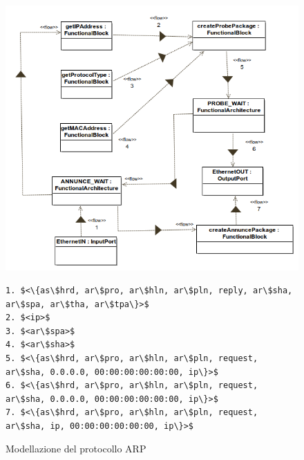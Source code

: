 \begin{figure}[h!] 
    \centering 
    \includegraphics[scale=0.6]{img/ARP/ARP.png} 
    \begin{lstlisting}[frame=single, mathescape, basicstyle=\footnotesize]
1. $<\{as\$hrd, ar\$pro, ar\$hln, ar\$pln, reply, ar\$sha, ar\$spa, ar\$tha, ar\$tpa\}>$
2. $<ip>$
3. $<ar\$spa>$
4. $<ar\$sha>$
5. $<\{as\$hrd, ar\$pro, ar\$hln, ar\$pln, request, ar\$sha, 0.0.0.0, 00:00:00:00:00:00, ip\}>$
6. $<\{as\$hrd, ar\$pro, ar\$hln, ar\$pln, request, ar\$sha, 0.0.0.0, 00:00:00:00:00:00, ip\}>$
7. $<\{as\$hrd, ar\$pro, ar\$hln, ar\$pln, request, ar\$sha, ip, 00:00:00:00:00:00, ip\}>$
    \end{lstlisting}
    \caption{Modellazione del protocollo ARP} 
    \label{fig:ARP}
\end{figure}
\newpage
